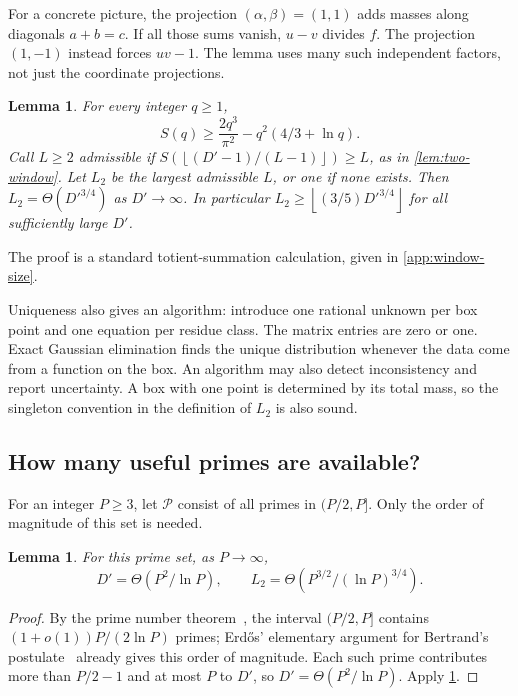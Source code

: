 \documentclass[11pt,letterpaper]{article}
\newtheorem{lemma}[theorem]{Lemma}
\theoremstyle{definition}
\theoremstyle{remark}
\newcommand{\floor}[1]{\left\lfloor #1\right\rfloor}
\newcommand{\cP}{\mathcal P}
\begin{document}
For a concrete picture, the projection \((\alpha,\beta)=(1,1)\)
adds masses along diagonals \(a+b=c\). If all those sums vanish,
\(u-v\) divides \(f\). The projection \((1,-1)\) instead forces
\(uv-1\). The lemma uses many such independent factors, not just
the coordinate projections.

\begin{lemma}\label{lem:window-size}
For every integer \(q\ge1\),
\[
 S(q)\ge\frac{2q^3}{\pi^2}-q^2(4/3+\ln q).
\]
Call \(L\ge2\) admissible if \(S(\floor{(D'-1)/(L-1)})\ge L\), as in
\cref{lem:two-window}. Let \(L_2\) be the largest admissible \(L\),
or one if none exists. Then
\(L_2=\Theta(D'^{3/4})\) as \(D'\to\infty\).
In particular \(L_2\ge\floor{(3/5)D'^{3/4}}\) for all sufficiently
large \(D'\).
\end{lemma}
The proof is a standard totient-summation calculation, given in
\cref{app:window-size}.

Uniqueness also gives an algorithm: introduce one rational unknown
per box point and one equation per residue class. The matrix entries
are zero or one. Exact Gaussian elimination finds the unique
distribution whenever the data come from a function on the box.
An algorithm may also detect inconsistency and report uncertainty.
A box with one point is determined by its total mass, so the
singleton convention in the definition of \(L_2\) is also sound.

\subsection{How many useful primes are available?}

For an integer \(P\ge3\), let \(\cP\) consist of all primes in
\((P/2,P]\). Only the order of magnitude of this set is needed.

\begin{lemma}\label{lem:primes}
For this prime set, as \(P\to\infty\),
\[
 D'=\Theta(P^2/\ln P),\qquad
 L_2=\Theta\!\left(P^{3/2}/(\ln P)^{3/4}\right).
\]
\end{lemma}
\begin{proof}
By the prime number theorem~\cite[Chapters~4 and~13]{Apostol76}, the
interval \((P/2,P]\) contains \((1+o(1))P/(2\ln P)\) primes;
Erd\H{o}s' elementary argument for Bertrand's postulate~\cite{Erdos32}
already gives this order of magnitude. Each such prime contributes
more than \(P/2-1\) and at most \(P\) to \(D'\), so
\(D'=\Theta(P^2/\ln P)\). Apply \cref{lem:window-size}.
\end{proof}
\end{document}
